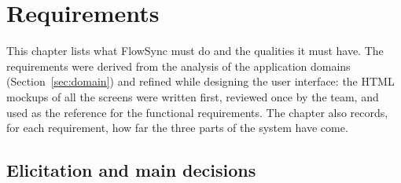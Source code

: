 \chapter{Requirements}
\label{chap:requirements}

This chapter lists what FlowSync must do and the qualities it must have. The requirements were
derived from the analysis of the application domains (Section~\ref{sec:domain}) and refined
while designing the user interface: the HTML mockups of all the screens were written first,
reviewed once by the team, and used as the reference for the functional requirements. The
chapter also records, for each requirement, how far the three parts of the system have come.


\section{Elicitation and main decisions}
\label{sec:elicitation}

